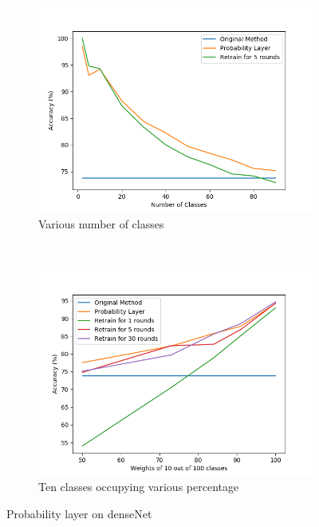 \documentclass{article}
\begin{document}
\begin{figure}
    \centering
    \begin{subfigure}[b]{0.49\textwidth}
        \centering
        \includegraphics[width=\textwidth]{PLvsRetrain.png}
        \caption{Various number of classes}
        \label{fig:complexNumber}
    \end{subfigure}
    ~ %
    \begin{subfigure}[b]{0.49\textwidth}
        \centering
        \includegraphics[width=\textwidth]{VaryingDistribution.png}
        \caption{Ten classes occupying various percentage}
        \label{fig:complexDistribution}
    \end{subfigure}
    \caption{Probability layer on denseNet}\label{fig:complex}
\end{figure}
\end{document}

